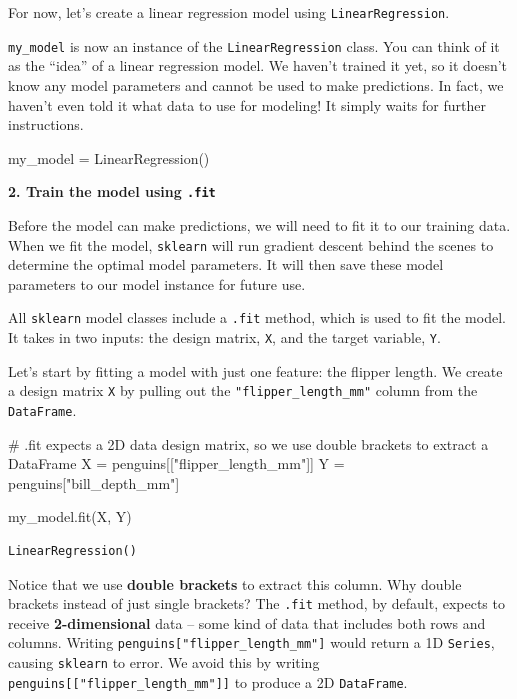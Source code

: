 \documentclass[
  letterpaper,
  DIV=11,
  numbers=noendperiod]{scrreprt}
\newenvironment{Shaded}{\begin{snugshade}}{\end{snugshade}}
\newcommand{\CommentTok}[1]{\textcolor[rgb]{0.37,0.37,0.37}{#1}}
\newcommand{\NormalTok}[1]{\textcolor[rgb]{0.00,0.23,0.31}{#1}}
\newcommand{\OperatorTok}[1]{\textcolor[rgb]{0.37,0.37,0.37}{#1}}
\newcommand{\StringTok}[1]{\textcolor[rgb]{0.13,0.47,0.30}{#1}}
\begin{document}
For now, let's create a linear regression model using
\texttt{LinearRegression}.

\texttt{my\_model} is now an instance of the \texttt{LinearRegression}
class. You can think of it as the ``idea'' of a linear regression model.
We haven't trained it yet, so it doesn't know any model parameters and
cannot be used to make predictions. In fact, we haven't even told it
what data to use for modeling! It simply waits for further instructions.

\begin{Shaded}
\begin{Highlighting}[]
\NormalTok{my\_model }\OperatorTok{=}\NormalTok{ LinearRegression()}
\end{Highlighting}
\end{Shaded}

\textbf{2. Train the model using \texttt{.fit}}

Before the model can make predictions, we will need to fit it to our
training data. When we fit the model, \texttt{sklearn} will run gradient
descent behind the scenes to determine the optimal model parameters. It
will then save these model parameters to our model instance for future
use.

All \texttt{sklearn} model classes include a \texttt{.fit} method, which
is used to fit the model. It takes in two inputs: the design matrix,
\texttt{X}, and the target variable, \texttt{Y}.

Let's start by fitting a model with just one feature: the flipper
length. We create a design matrix \texttt{X} by pulling out the
\texttt{"flipper\_length\_mm"} column from the \texttt{DataFrame}.

\begin{Shaded}
\begin{Highlighting}[]
\CommentTok{\# .fit expects a 2D data design matrix, so we use double brackets to extract a DataFrame}
\NormalTok{X }\OperatorTok{=}\NormalTok{ penguins[[}\StringTok{"flipper\_length\_mm"}\NormalTok{]]}
\NormalTok{Y }\OperatorTok{=}\NormalTok{ penguins[}\StringTok{"bill\_depth\_mm"}\NormalTok{]}

\NormalTok{my\_model.fit(X, Y)}
\end{Highlighting}
\end{Shaded}

\begin{verbatim}
LinearRegression()
\end{verbatim}

Notice that we use \textbf{double brackets} to extract this column. Why
double brackets instead of just single brackets? The \texttt{.fit}
method, by default, expects to receive \textbf{2-dimensional} data --
some kind of data that includes both rows and columns. Writing
\texttt{penguins{[}"flipper\_length\_mm"{]}} would return a 1D
\texttt{Series}, causing \texttt{sklearn} to error. We avoid this by
writing \texttt{penguins{[}{[}"flipper\_length\_mm"{]}{]}} to produce a
2D \texttt{DataFrame}.
\end{document}
